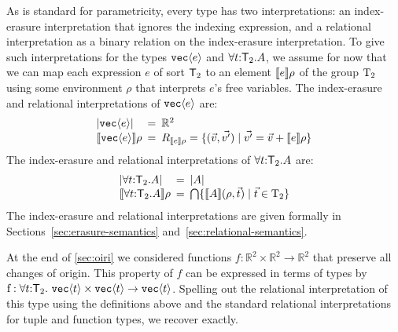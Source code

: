As is standard for parametricity, every type has two interpretations:
an index-erasure interpretation that ignores the indexing expression,
and a relational interpretation as a binary relation on the
index-erasure interpretation. To give such interpretations for the
types $\textup{\texttt{vec}}\langle e \rangle$ and $\forall t\mathord:\mathsf{T}_2.A$, we
assume for now that we can map each expression $e$ of sort
$\mathsf{T}_2$ to an element $\llbracket e \rrbracket\rho$ of the group $\mathrm{T}_2$
using some environment $\rho$ that interprets $e$'s free
variables. The index-erasure and relational interpretations of
$\textup{\texttt{vec}}\langle e \rangle$ are:
\begin{displaymath}
  \begin{array}{l@{\hspace{0.5em}=\hspace{0.5em}}l}
    \tySem{\tyPrim{vec}{e}} & \mathbb{R}^2
    \\ \rsem{\tyPrim{vec}{e}}{}\rho & R_{\sem{e}\rho} = \{
    (\vec{v},\vec{v'}) \sepbar \vec{v'} = \vec{v} + \sem{e}\rho \}
  \end{array}
\end{displaymath}
The index-erasure and relational interpretations of 
$\forall t\mathord:\mathsf{T}_2.A$ are:
\begin{displaymath}
  \begin{array}{l@{\hspace{0.5em}=\hspace{0.5em}}l}
    \tySem{\forall t\mathord:\SynTransl{2}.A} & \tySem{A}
    \\ \rsem{\forall t\mathord:\SynTransl{2}.A}{}\rho & \bigcap\{
    \rsem{A}{}{(\rho,\vec{t})} \sepbar \vec{t} \in \Transl{2} \}
  \end{array}
\end{displaymath}
The index-erasure and relational interpretations are given
formally in Sections~\ref{sec:erasure-semantics}
and~\ref{sec:relational-semantics}. %

At the end of \autoref{sec:oiri} we considered functions $f :
\mathbb{R}^2 \times \mathbb{R}^2 \to \mathbb{R}^2$ that preserve all
changes of origin. This property of $f$ can be expressed in terms of
types by
$  \mathrm{f} : \forall t \mathord: \SynTransl{2}.\ \tyPrim{vec}{t}
  \times \tyPrim{vec}{t} \to \tyPrim{vec}{t}$.
Spelling out the relational interpretation of this type using the
definitions above and the standard relational interpretations for
tuple and function types, we recover
 exactly.

